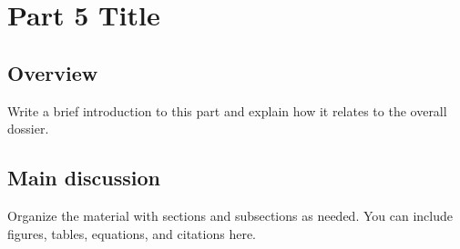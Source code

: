 \chapter{Part 5 Title}

\section{Overview}
Write a brief introduction to this part and explain how it relates to the overall dossier.

\section{Main discussion}
Organize the material with sections and subsections as needed. You can include
figures, tables, equations, and citations here.


